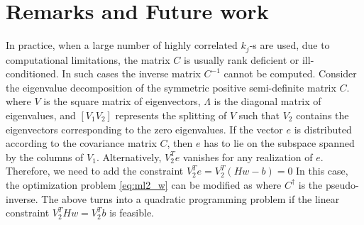 \documentclass[a4paper]{article}
\begin{document}
\section{Remarks and Future work}
\label{sec:numerical}
In practice, when a large number of highly correlated $k_j$-s are used, due to computational limitations, the matrix $C$ is
usually rank deficient or ill-conditioned. In such cases the inverse matrix $C^{-1}$ cannot be computed. Consider the
eigenvalue decomposition of the symmetric positive semi-definite matrix $C$.
where $V$ is the square matrix of eigenvectors, $\Lambda$ is the diagonal matrix of eigenvalues, and $[V_1 V_2]$
represents the splitting of $V$ such that $V_2$ contains the eigenvectors corresponding to the zero eigenvalues. If the
vector $e$ is distributed according to the covariance matrix $C$, then $e$ has to lie on the subspace spanned by the columns
of $V_1$. Alternatively, $V_2^T e$ vanishes for any realization of $e$.  Therefore, we need to add the constraint $V_2^T
e = V_2^T(Hw - b ) = 0$ In this case, the optimization problem \ref{eq:ml2_w} can be modified as 
where $C^{\dagger}$ is the pseudo-inverse. The above turns into a quadratic programming problem if the linear constraint $V_2^THw =
V_2^T b$ is feasible.


\end{document}
